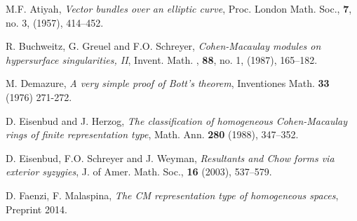 \documentclass[a4paper,10pt]{book}
\begin{document}
\begin{thebibliography}{999}


    M.F. Atiyah, {\em Vector bundles over an elliptic curve}, Proc. London Math. Soc., {\bf 7}, no. 3, (1957),
    414--452.


    R. Buchweitz, G. Greuel  and F.O. Schreyer, {\em Cohen-Macaulay modules on hypersurface singularities, II},
     Invent. Math. , {\bf 88}, no.  1, (1987), 165--182.


 M. Demazure, {\em A very simple proof of Bott's theorem}, Inventiones Math. {\bf 33} (1976) 271-272.




       D. Eisenbud and J. Herzog,  {\em The classification of homogeneous {C}ohen-{M}acaulay rings of finite representation type}, Math. Ann. {\bf 280} (1988), 347--352.



 D. Eisenbud, F.O. Schreyer  and J. Weyman,
    {\em Resultants and Chow forms via exterior syzygies},  J. of Amer. Math. Soc.,  {\bf 16}
    (2003), 537--579.

 D. Faenzi, F. Malaspina, {\em The CM representation type of homogeneous spaces}, Preprint 2014.


\end{thebibliography}
\end{document}
